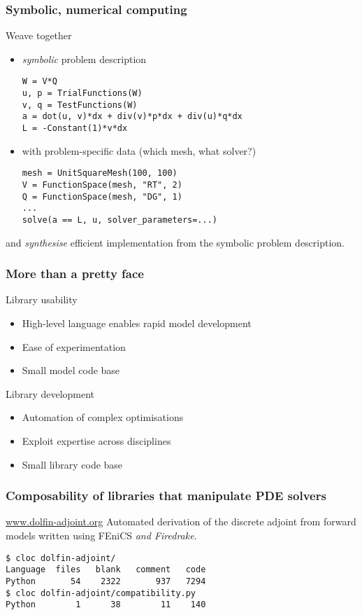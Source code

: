 \documentclass[presentation]{beamer}
\begin{document}
\begin{frame}[fragile]
  \frametitle{Symbolic, numerical computing}
  Weave together
  \begin{itemize}
  \item \emph{symbolic} problem description
\begin{verbatim}
W = V*Q
u, p = TrialFunctions(W)
v, q = TestFunctions(W)
a = dot(u, v)*dx + div(v)*p*dx + div(u)*q*dx
L = -Constant(1)*v*dx
\end{verbatim}
  \item with problem-specific data (which mesh, what solver?)
\begin{verbatim}
mesh = UnitSquareMesh(100, 100)
V = FunctionSpace(mesh, "RT", 2)
Q = FunctionSpace(mesh, "DG", 1)
...
solve(a == L, u, solver_parameters=...)
\end{verbatim}
  \end{itemize}
  and \emph{synthesise} efficient implementation from
  the symbolic problem description.
\end{frame}
\begin{frame}
  \frametitle{More than a pretty face}

  \begin{block}{Library usability}
    \begin{itemize}
    \item High-level language enables rapid model development
    \item Ease of experimentation
    \item Small model code base
    \end{itemize}
  \end{block}

  \begin{block}{Library development}
    \begin{itemize}
    \item Automation of complex optimisations
    \item Exploit expertise across disciplines
    \item Small library code base
    \end{itemize}
  \end{block}
\end{frame}

\begin{frame}[fragile]
  \frametitle{Composability of libraries that manipulate PDE solvers}
  \begin{block}{\url{www.dolfin-adjoint.org}}
    Automated derivation of the discrete adjoint from forward models
    written using FEniCS \emph{and Firedrake}.

\begin{verbatim}
$ cloc dolfin-adjoint/
Language  files   blank   comment   code
Python       54    2322       937   7294
$ cloc dolfin-adjoint/compatibility.py
Python        1      38        11    140
\end{verbatim}
  \end{block}
\end{frame}
\end{document}
